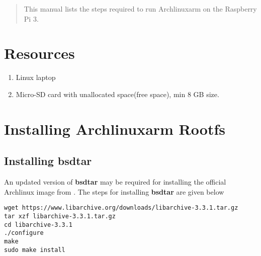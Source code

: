 \documentclass[journal,12pt,twocolumn]{IEEEtran}
\begin{document}
\tableofcontents

\bigskip

\begin{abstract}
This manual lists the steps required to run Archlinuxarm on the Raspberry Pi 3.
\end{abstract}




%
\IEEEpeerreviewmaketitle


%
%

\section{Resources}
\begin{enumerate}[1.]
\item Linux laptop
\item Micro-SD card with unallocated space(free space), min 8 GB size.
\end{enumerate}


\section{Installing Archlinuxarm Rootfs}
\subsection{Installing bsdtar}
An updated version of \textbf{bsdtar } may be required for installing the official Archlinux image from \cite{alarm_off}.  The steps for installing \textbf{bsdtar} are
given below \cite{alarm_bsdtar}
\begin{lstlisting}
wget https://www.libarchive.org/downloads/libarchive-3.3.1.tar.gz
tar xzf libarchive-3.3.1.tar.gz
cd libarchive-3.3.1
./configure
make
sudo make install
\end{lstlisting}
\end{document}
